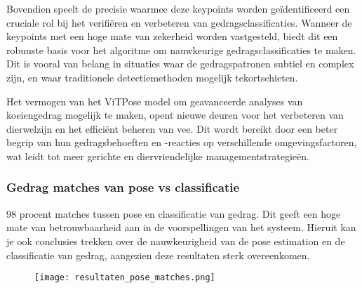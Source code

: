 Bovendien speelt de precisie waarmee deze keypoints worden geïdentificeerd een cruciale rol bij het verifiëren en verbeteren van gedragsclassificaties. Wanneer de keypoints met een hoge mate van zekerheid worden vastgesteld, biedt dit een robuuste basis voor het algoritme om nauwkeurige gedragsclassificaties te maken. Dit is vooral van belang in situaties waar de gedragspatronen subtiel en complex zijn, en waar traditionele detectiemethoden mogelijk tekortschieten.

Het vermogen van het ViTPose model om geavanceerde analyses van koeiengedrag mogelijk te maken, opent nieuwe deuren voor het verbeteren van dierwelzijn en het efficiënt beheren van vee. Dit wordt bereikt door een beter begrip van hun gedragsbehoeften en -reacties op verschillende omgevingsfactoren, wat leidt tot meer gerichte en diervriendelijke managementstrategieën.
\subsubsection{Gedrag matches van pose vs classificatie}
98 procent matches tussen pose en classificatie van gedrag. Dit geeft een hoge mate van betrouwbaarheid aan in de voorspellingen van het systeem. 
Hieruit kan je ook conclusies trekken over de nauwkeurigheid van de pose estimation en de classificatie van gedrag, aangezien deze resultaten sterk overeenkomen.
\newline
\begin{figure}[H]
  \centering
  \texttt{[image: resultaten\_pose\_matches.png]}
  \label{fig:posematches}
\end{figure}
\newline
